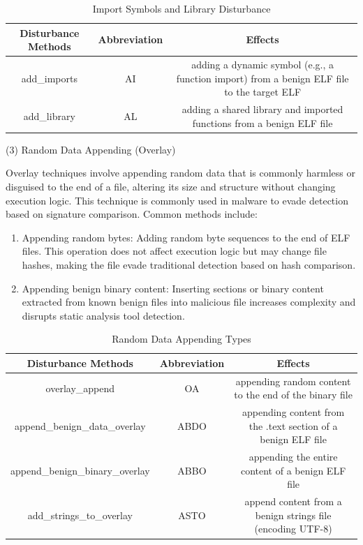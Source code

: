 \begin{table}[htbp]
	\centering
	\caption{Import Symbols and Library Disturbance}\label{tab:4.2}
	\begin{tabular*}{\textwidth}{@{\extracolsep{\fill}}ccc}
		\toprule
		Disturbance Methods & Abbreviation & Effects \\
		\midrule
		add\_imports & AI & adding a dynamic symbol (e.g., a function import) from a benign ELF file to the target ELF \\
		add\_library & AL & adding a shared library and imported functions from a benign ELF file \\
		\bottomrule
	\end{tabular*}
\end{table}



(3) Random Data Appending (Overlay)

Overlay techniques involve appending random data that is commonly harmless or disguised to the end of a file, altering its size and structure without changing execution logic. This technique is commonly used in malware to evade detection based on signature comparison. Common methods include:
\begin{enumerate}

\item Appending random bytes: Adding random byte sequences to the end of ELF files. This operation does not affect execution logic but may change file hashes, making the file evade traditional detection based on hash comparison.

\item Appending benign binary content: Inserting sections or binary content extracted from known benign files into malicious file increases complexity and disrupts static analysis tool detection.
\end{enumerate}

\begin{table}[htbp]
	\centering
	\caption{ Random Data Appending Types}\label{tab:4.3}
	\begin{tabular*}{\textwidth}{@{\extracolsep{\fill}}ccc}
		\toprule
		Disturbance Methods & Abbreviation & Effects \\
		\midrule
		overlay\_append & OA & appending random content to the end of the binary file \\
		append\_benign\_data\_overlay & ABDO & appending content from the .text section of a benign ELF file \\
		append\_benign\_binary\_overlay & ABBO &  appending the entire content of a benign ELF file \\
		add\_strings\_to\_overlay & ASTO & append content from a benign strings file (encoding UTF-8) \\
		\bottomrule
	\end{tabular*}
\end{table}

